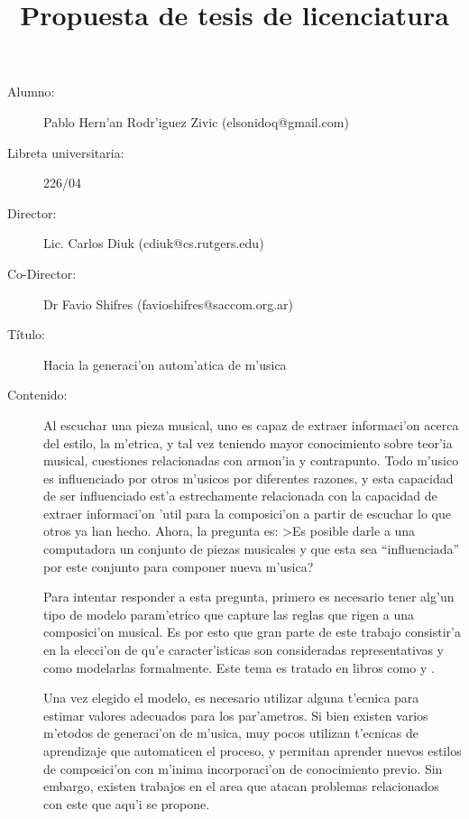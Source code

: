 \documentclass[a4paper,10pt]{article}
\title{Propuesta de tesis de licenciatura}
\begin{document}

\maketitle
 \begin{description}
  \item[Alumno:] Pablo Hern'an Rodr'iguez Zivic (elsonidoq@gmail.com)
  \item[Libreta universitaria:] 226/04
  \item[Director:] Lic. Carlos Diuk (cdiuk@cs.rutgers.edu)
  \item[Co-Director:] Dr Favio Shifres (favioshifres@saccom.org.ar)
  \item[T\'itulo:] Hacia la generaci'on autom'atica de m'usica
  \item[Contenido:] Al escuchar una pieza musical, uno es capaz de extraer informaci'on acerca del 
	estilo, la m'etrica, y tal vez teniendo mayor conocimiento sobre teor'ia musical, cuestiones relacionadas 
	con armon'ia y contrapunto. Todo m'usico es influenciado por otros m'usicos por diferentes razones, 
	y esta capacidad de ser influenciado est'a estrechamente relacionada con la capacidad de extraer 
	informaci'on 'util para la composici'on a partir de escuchar lo que otros ya han hecho.
	Ahora, la pregunta es: >Es posible darle a una computadora un conjunto de piezas musicales y que esta sea 
	``influenciada'' por este conjunto para componer nueva m'usica?
    
    Para intentar responder a esta pregunta, primero es necesario tener alg'un
    tipo de modelo param'etrico que capture las reglas que rigen a una composici'on musical.
    Es por esto que gran parte de este trabajo consistir'a en la elecci'on de qu'e 
    caracter'isticas son consideradas representativas y como modelarlas formalmente. 
    Este tema es tratado en libros como \cite{Musimathics} y \cite{MuPr}.
    
    Una vez elegido el modelo, es necesario utilizar alguna t'ecnica para
    estimar valores adecuados para los par'ametros. Si bien existen varios m'etodos de 
    generaci'on de m'usica, muy pocos utilizan t'ecnicas de aprendizaje 
	que automaticen el proceso, y permitan aprender nuevos estilos de composici'on con m'inima
	incorporaci'on de conocimiento previo. Sin embargo, existen trabajos en el
    area que atacan problemas relacionados con este que aqu'i se propone. 


\end{description}
\end{document}
